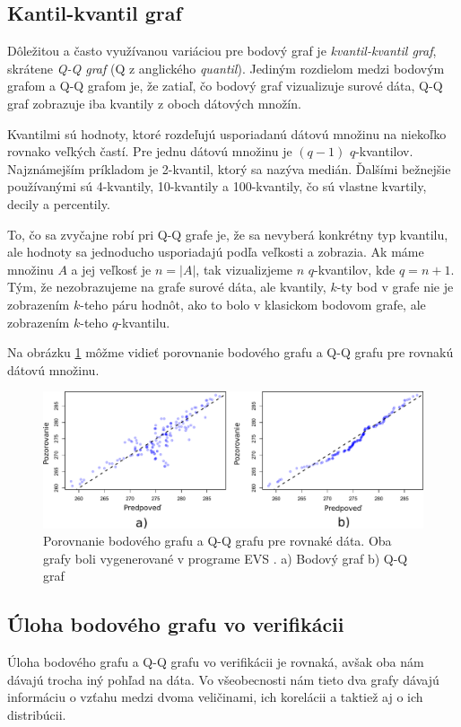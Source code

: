 \subsection{Kantil-kvantil graf}
\label{subsec:qqplot}
Dôležitou a často využívanou variáciou pre bodový graf je \textit{kvantil-kvantil graf}, skrátene \textit{\mbox{Q-Q} graf} (Q z anglického \textit{quantil}). Jediným rozdielom medzi bodovým grafom a \mbox{Q-Q} grafom je, že zatiaľ, čo bodový graf vizualizuje surové dáta, \mbox{Q-Q} graf zobrazuje iba kvantily z oboch dátových množín. 

Kvantilmi sú hodnoty, ktoré rozdeľujú usporiadanú dátovú množinu na niekoľko rovnako veľkých častí. Pre jednu dátovú množinu je $ (q - 1) $ $ q $-kvantilov. Najznámejším príkladom je \mbox{2-kvantil}, ktorý sa nazýva medián. Ďalšími bežnejšie používanými sú \mbox{4-kvantily}, \mbox{10-kvantily} a \mbox{100-kvantily}, čo sú vlastne kvartily, decily a percentily. 

To, čo sa zvyčajne robí pri \mbox{Q-Q} grafe je, že sa nevyberá konkrétny typ kvantilu, ale hodnoty sa jednoducho usporiadajú podľa veľkosti a zobrazia. Ak máme množinu $ A $ a jej veľkosť je $ n = \lvert A \rvert $, tak vizualizjeme $ n $ \mbox{$ q $-kvantilov}, kde $ q = n + 1 $.  Tým, že nezobrazujeme na grafe surové dáta, ale kvantily, \mbox{$ k $-ty} bod v grafe nie je zobrazením \mbox{$ k $-teho} páru hodnôt, ako to bolo v klasickom bodovom grafe, ale zobrazením \mbox{$ k $-teho} \mbox{$ q $-kvantilu}. 

Na obrázku \ref{fig:scattervsqq} môžme vidieť porovnanie bodového grafu a \mbox{Q-Q} grafu pre rovnakú dátovú množinu.


\begin{figure}
	\centering
	\includegraphics[width = 5.5in]{scattervsqq}
	\caption{Porovnanie bodového grafu a Q-Q grafu pre rovnaké dáta. Oba grafy boli vygenerované v programe EVS \cite{EVS}. a) Bodový graf b) Q-Q graf }
	\label{fig:scattervsqq}
\end{figure}

\subsection{Úloha bodového grafu vo verifikácii}
Úloha bodového grafu a \mbox{Q-Q} grafu vo verifikácii je rovnaká, avšak oba nám dávajú trocha iný pohľad na dáta. Vo všeobecnosti nám tieto dva grafy dávajú informáciu o vzťahu medzi dvoma veličinami, ich korelácii a taktiež aj o ich distribúcii. 

